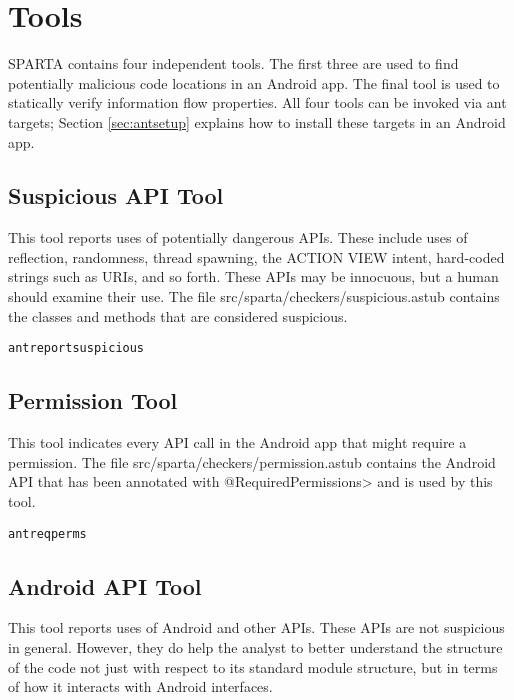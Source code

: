 \htmlhr
\chapter{Tools\label{tools}}

SPARTA contains four independent tools.  The first three are used to find potentially malicious code
 locations in an Android app.  The final tool is used to statically verify information flow properties. 
  All four tools can be invoked via  ant targets;  Section
\ref{sec:antsetup} explains how to install these targets in an Android app.

\section{Suspicious API Tool\label{sec:suspicioustool}}

This tool reports uses of potentially dangerous APIs. These include uses of reflection, randomness, thread spawning, the ACTION VIEW intent, hard-coded strings such as URIs, and so forth. These APIs may be innocuous, but a human should examine their use.  The file src/sparta/checkers/suspicious.astub contains the classes and methods that are considered suspicious.
 
\begin{alltt}
ant reportsuspicious
\end{alltt}

\section{Permission Tool\label{sec:permtool}}
  
This tool indicates every API call in the Android app that might require a permission.  The file src/sparta/checkers/permission.astub contains the Android API that has been annotated with \<@RequiredPermissions> and is used by this tool.

 \begin{alltt}
ant reqperms
\end{alltt}


\section{Android API Tool\label{sec:generaltool}}

This tool reports uses of Android and other APIs. These APIs are not suspicious in general. However, they do help the analyst to better understand the structure of the code not just with respect to its standard module structure, but in terms of how it interacts with Android interfaces. 


